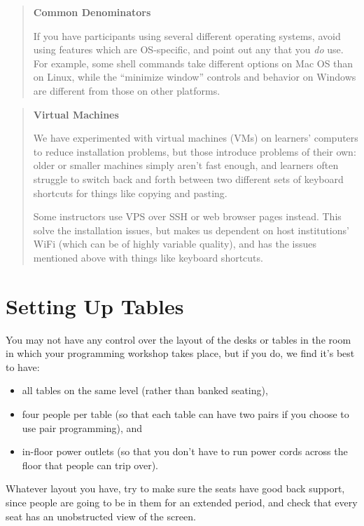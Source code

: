 \documentclass[10pt,statementpaper]{memoir}
\begin{document}
\begin{quote}
\textbf{Common Denominators}

If you have participants using several different operating systems,
avoid using features which are OS-specific, and point out any that you
\emph{do} use. For example, some shell commands take different options
on Mac OS than on Linux, while the ``minimize window'' controls and
behavior on Windows are different from those on other platforms.
\end{quote}

\begin{quote}
\textbf{Virtual Machines}

We have experimented with virtual machines (VMs) on learners' computers
to reduce installation problems, but those introduce problems of their
own: older or smaller machines simply aren't fast enough, and learners
often struggle to switch back and forth between two different sets of
keyboard shortcuts for things like copying and pasting.

Some instructors use VPS over SSH or web browser pages instead. This
solve the installation issues, but makes us dependent on host
institutions' WiFi (which can be of highly variable quality), and has
the issues mentioned above with things like keyboard shortcuts.
\end{quote}

\section{Setting Up Tables}\label{setting-up-tables}

You may not have any control over the layout of the desks or tables in
the room in which your programming workshop takes place, but if you do,
we find it's best to have:

\newpage

\begin{itemize}
\item
  all tables on the same level (rather than banked seating),
\item
  four people per table (so that each table can have two pairs if you
  choose to use pair programming), and
\item
  in-floor power outlets (so that you don't have to run power cords
  across the floor that people can trip over).
\end{itemize}

Whatever layout you have, try to make sure the seats have good back
support, since people are going to be in them for an extended period,
and check that every seat has an unobstructed view of the screen.
\end{document}
